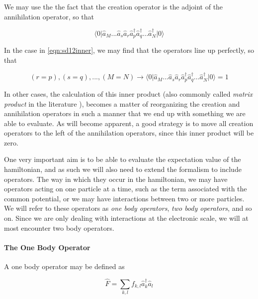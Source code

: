We may use the the fact that the creation operator is the adjoint of the annihilation operator, so that

\begin{equation}
\langle 0\vert  \hat{a}_M ...  \hat{a}_s  \hat{a}_r   \hat{a}_p^\dagger \hat{a}_q^\dagger  ... \hat{a}_N^\dagger \vert 0 \rangle
\label{eqn:sd12inner}
\end{equation}

 

In the case in \ref{eqn:sd12inner}, we may find that the operators line up perfectly, so that

\begin{equation}
(r=p), (s=q), ... ,(M=N) \rightarrow
\langle 0\vert  \hat{a}_M ...  \hat{a}_s  \hat{a}_r   \hat{a}_p^\dagger \hat{a}_q^\dagger  ... \hat{a}_N^\dagger \vert 0 \rangle = 1
\label{eqn:sd12inner_prog}
\end{equation}

In other cases, the calculation of this inner product (also commonly called \emph{matrix product} in the literature \cite{ShavittBartlett2009}), becomes a matter of reorganizing the creation and annihilation operators in such a manner that we end up with something we are able to evaluate. As will become apparent, a good strategy is to move all creation operators to the left of the annihilation operators, since this inner product will be zero.

One very important aim is to be able to evaluate the expectation value of the hamiltonian, and as such we will also need to extend the formalism to include operators. The way in which they occur in the hamiltonian, we may have operators acting on one particle at a time, such as the term associated with the common potential, or we may have interactions between two or more particles. We will refer to these operators as \emph{one body operators}, \emph{two body operators}, and so on. Since we are only dealing with interactions at the electronic scale, we will at most encounter two body operators. 

\paragraph{The One Body Operator}

A one body operator may be defined as \cite{ShavittBartlett2009}

\begin{equation}
\hat{F} = \sum_{k,l} f_{k,l}  \hat{a}_k^{\dagger} \hat{a}_l
\label{eqn:onebody}
\end{equation}

